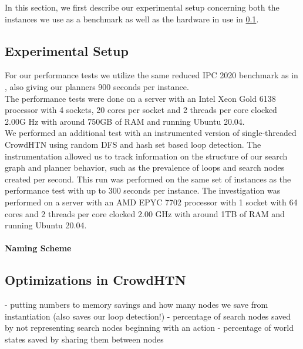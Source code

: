 In this section, we first describe our experimental setup concerning both the instances we use as a benchmark as well as the hardware in use in \ref{eval: setup}.

\subsection{Experimental Setup}
\label{eval: setup}
For our performance tests we utilize the same reduced IPC 2020 benchmark as in \cite{bretl2021parallel}, also giving our planners 900 seconds per instance. \\
The performance tests were done on a server with an Intel Xeon Gold 6138 processor with 4 sockets, 20 cores per socket and 2 threads per core clocked 2.00G Hz with around 750GB of RAM and running Ubuntu 20.04.\\
We performed an additional test with an instrumented version of single-threaded CrowdHTN using random DFS and hash set based loop detection. The instrumentation allowed us to track information on the structure of our search graph and planner behavior, such as the prevalence of loops and search nodes created per second. This run was performed on the same set of instances as the performance test with up to 300 seconds per instance. The investigation was performed on a server with an AMD EPYC 7702 processor with 1 socket with 64 cores and 2 threads per core clocked 2.00 GHz with around 1TB of RAM and running Ubuntu 20.04. \\

\paragraph{Naming Scheme}

\subsection{Optimizations in CrowdHTN}
\label{eval: crowd optimizations}
- putting numbers to memory savings and how many nodes we save from instantiation (also saves our loop detection!)
- percentage of search nodes saved by not representing search nodes beginning with an action
- percentage of world states saved by sharing them between nodes

